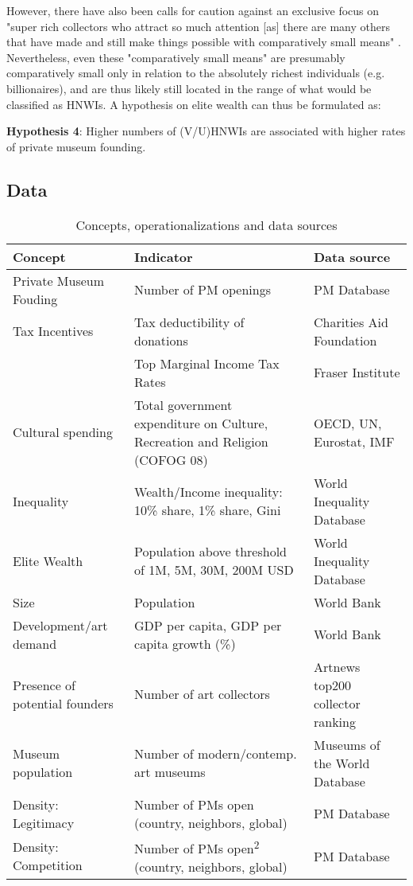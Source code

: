 \documentclass[11pt]{article}
\begin{document}
However, there have also been calls for caution against an exclusive focus on "super rich collectors who attract so much attention [as] there are many others that have made and still make things possible with comparatively small means" \parencite[p.12]{Bechtler_Imhof_2018_future}.
Nevertheless, even these "comparatively small means" are presumably comparatively small only in relation to the absolutely richest individuals (e.g. billionaires), and are thus likely still located in the range of what would be classified as HNWIs.
A hypothesis on elite wealth can thus be formulated as: 

\bigbreak
\noindent
\textbf{Hypothesis 4}: Higher numbers of (V/U)HNWIs are associated with higher rates of private museum founding.




\subsection*{Data}


\begin{table}[htbp]
\caption{\label{tbl:data_srcs}Concepts, operationalizations and data sources}
\centering
\begin{tabular}{lp{7cm}l}
\hline
Concept & Indicator & Data source\\
\hline
Private Museum Fouding & Number of PM openings & PM Database\\
Tax Incentives & Tax deductibility of donations & Charities Aid Foundation\\
 & Top Marginal Income Tax Rates & Fraser Institute\\
Cultural spending & Total government expenditure on Culture, Recreation and Religion (COFOG 08) & OECD, UN, Eurostat, IMF\\
Inequality & Wealth/Income inequality: 10\% share, 1\% share, Gini & World Inequality Database\\
Elite Wealth & Population above threshold of 1M, 5M, 30M, 200M USD & World Inequality Database\\
Size & Population & World Bank\\
Development/art demand & GDP per capita, GDP per capita growth (\%) & World Bank\\
Presence of potential founders & Number of art collectors & Artnews top200 collector ranking\\
Museum population & Number of modern/contemp. art museums & Museums of the World Database\\
Density: Legitimacy & Number of PMs open (country, neighbors, global) & PM Database\\
Density: Competition & Number of PMs open\textsuperscript{2} (country, neighbors, global) & PM Database\\
\hline
\end{tabular}
\end{table}
\end{document}
